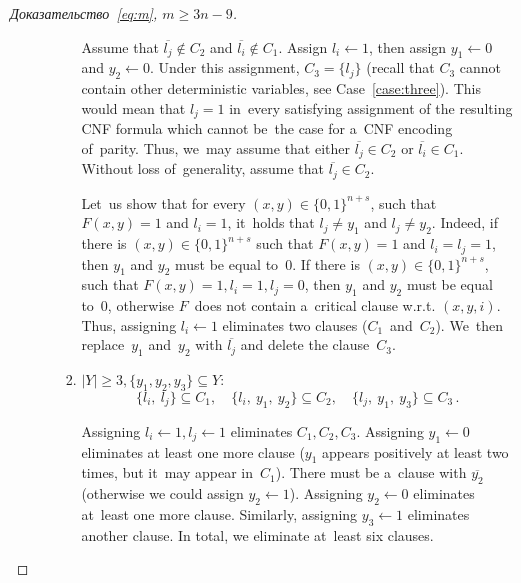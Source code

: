 \begin{proof}[Доказательство~\eqref{eq:m}, $m \ge 3n-9$]
\begin{enumerate}
\begin{enumerate}
\begin{enumerate}
				Assume that $\overline{l_j} \not \in C_2$ and $\overline{l_i} \not \in C_1$. Assign $l_i \gets 1$, then assign $y_1 \gets 0$ and $y_2 \gets 0$. Under this assignment, $C_3 = \{l_j\}$ (recall that $C_3$ cannot contain other deterministic variables, see Case~\ref{case:three}). This would mean that $l_j=1$ in~every satisfying assignment of the resulting CNF formula which cannot be~the case for a~CNF encoding of~parity.
				Thus, we~may assume that either $\overline{l_j} \in C_2$ or $\overline{l_i} \in C_1$. Without loss of~generality, assume that
				$\overline{l_j} \in C_2$.
				
				Let~us show that for every $(x, y) \in \{0, 1\}^{n + s}$, such that $F(x, y) = 1$ and $l_i = 1$, it~holds that $l_j \neq y_1$ and $l_j \neq y_2$. Indeed, if there is $(x, y) \in \{0, 1\}^{n + s}$ such that $F(x,y)=1$ and $l_i = l_j = 1$, then $y_1$ and $y_2$ must be equal to~$0$. If there is $(x, y) \in \{0, 1\}^{n + s}$, such that $F(x, y) = 1, l_i = 1, l_j = 0$, then $y_1$ and $y_2$ must be equal to~$0$, otherwise $F$~does not contain a~critical clause w.r.t. $(x, y, i)$. Thus, assigning $l_i \gets 1$ eliminates two clauses ($C_1$~and~$C_2$). We~then replace~$y_1$ and~$y_2$ with $\overline{l_j}$ and delete the clause~$C_3$.
				
				\item $|Y| \ge 3, \{y_1,y_2,y_3\} \subseteq Y$: \[\{l_i,\ l_j\} \subseteq C_1,\quad  \{l_i,\ y_1,\ y_2\} \subseteq C_2,\quad  \{l_j,\ y_1,\ y_3\} \subseteq C_3 \, .\]
				
				Assigning $l_i \gets 1, l_j \gets 1$ eliminates $C_1, C_2, C_3$. Assigning $y_1 \gets 0$ eliminates at least one more clause
				($y_1$ appears positively at least two times, but it~may appear in~$C_1$).
				There must be a~clause with $\overline{y_2}$ (otherwise we could assign $y_2 \gets 1$). Assigning $y_2 \gets 0$ eliminates at~least one more clause. Similarly, assigning $y_3 \gets 1$ eliminates another clause. In total, we eliminate at~least six clauses.
			\end{enumerate}
		\end{enumerate}
	\end{enumerate}
\end{proof}